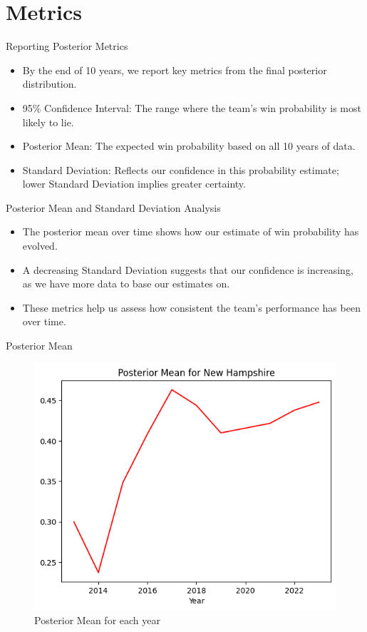 \section{Metrics}

\begin{frame}{Reporting Posterior Metrics}

  \begin{itemize}
    \item By the end of 10 years, we report key metrics from the final posterior distribution.
    \item 95\% Confidence Interval: The range where the team’s win probability is most likely to lie.
    \item Posterior Mean: The expected win probability based on all 10 years of data.
    \item Standard Deviation: Reflects our confidence in this probability estimate; lower Standard Deviation implies greater certainty.
  \end{itemize}
  
\end{frame}

\begin{frame}{Posterior Mean and Standard Deviation Analysis}

  \begin{itemize}
    \item The posterior mean over time shows how our estimate of win probability has evolved.
    \item A decreasing Standard Deviation suggests that our confidence is increasing, as we have more data to base our estimates on.
    \item These metrics help us assess how consistent the team’s performance has been over time.
  \end{itemize}
  
\end{frame}

\begin{frame}{Posterior Mean}
    
\begin{figure}
  \centering
  \includegraphics[width=.8\linewidth]{../Report/images/posterior-mean.png}
  \caption{Posterior Mean for each year}
\end{figure}

\end{frame}

